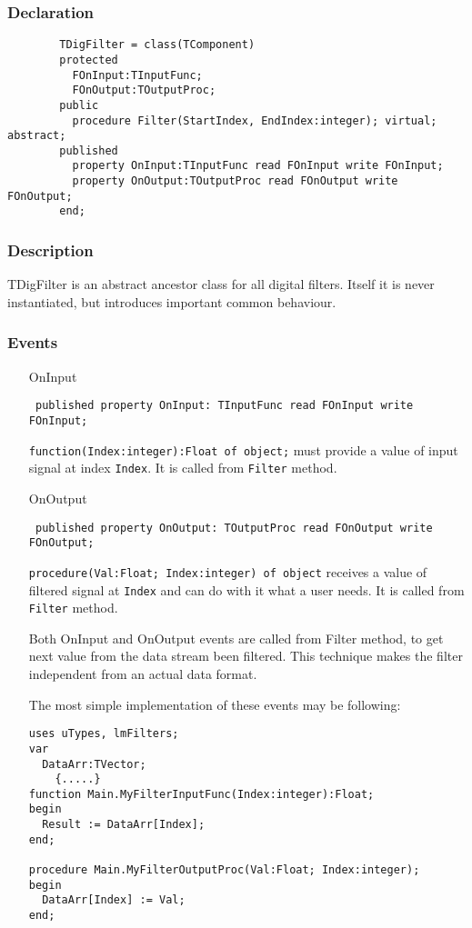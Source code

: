 \documentclass[12pt,a4paper,oneside]{report}
\newcommand{\declarationitem}[1]{{\addfontfeatures{FakeBold=1.3} #1}}
\newcommand{\code}[1]{\texttt{#1}}
\begin{document}
\subsubsection{Declaration}
	\begin{verbatim}
		TDigFilter = class(TComponent)
		protected
		  FOnInput:TInputFunc;
		  FOnOutput:TOutputProc;
		public
		  procedure Filter(StartIndex, EndIndex:integer); virtual; abstract;
		published
		  property OnInput:TInputFunc read FOnInput write FOnInput;
		  property OnOutput:TOutputProc read FOnOutput write FOnOutput;
		end;
		\end{verbatim}
\subsubsection{Description}
TDigFilter is an abstract ancestor class for all digital filters. Itself it is never instantiated, but introduces important common behaviour. 
\subsubsection{Events}
\begin{itemize}\label{lmfilters.TDigFilter-OnInput}
	\item[\declarationitem{OnInput}\hfill]
	\begin{flushleft}
		\code{
			published property OnInput: TInputFunc read FOnInput write FOnInput;}
	\end{flushleft}
	\par \code{function(Index:integer):Float of object;} must provide a value of input signal at index \code{Index}. It is called from \code{Filter}\label{lmfilters.TDigFilter-OnOutput} method.
	\item[\declarationitem{OnOutput}\hfill]
	\begin{flushleft}
		\code{
			published property OnOutput: TOutputProc read FOnOutput write FOnOutput;}
	\end{flushleft}
	\par \code{procedure(Val:Float; Index:integer) of object} receives a value of filtered signal at \code{Index} and can do with it what a user needs. It is called from \code{Filter} method.

	Both OnInput and OnOutput events are called from Filter method, to get next value from the data stream been filtered. This technique makes the filter independent from an actual data format.

	The most simple implementation of these events may be following:
\begin{verbatim}
uses uTypes, lmFilters;
var
  DataArr:TVector;
	{.....}
function Main.MyFilterInputFunc(Index:integer):Float;
begin
  Result := DataArr[Index];
end;

procedure Main.MyFilterOutputProc(Val:Float; Index:integer);
begin
  DataArr[Index] := Val;
end;
\end{verbatim}

\end{itemize}
\end{document}
